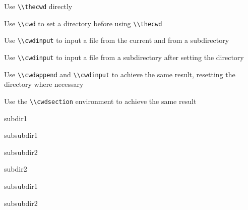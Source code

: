 \documentclass{scrartcl}
\begin{document}
\begin{latexbox}{Use \lstinline{\\thecwd} directly}
    \thecwd
\end{latexbox}

\begin{latexbox}{Use \lstinline{\\cwd} to set a directory before using \lstinline{\\thecwd}}
    \thecwd
\end{latexbox}

\begin{latexbox}{Use \lstinline{\\cwdinput} to input a file from the current and from a subdirectory}
\end{latexbox}

\begin{latexbox}{Use \lstinline{\\cwdinput} to input a file from a subdirectory after setting the directory}
\end{latexbox}

\begin{latexbox}{Use \lstinline{\\cwdappend} and \lstinline{\\cwdinput} to achieve the same result, resetting the directory where necessary}
\end{latexbox}

\begin{latexbox}{Use the \lstinline{\\cwdsection} environment to achieve the same result}
    \begin{cwdsection}{subdir1}
        \begin{cwdsection}{subsubdir1}
        \end{cwdsection}
        \begin{cwdsection}{subsubdir2}
        \end{cwdsection}
    \end{cwdsection}
    \begin{cwdsection}{subdir2}
        \begin{cwdsection}{subsubdir1}
        \end{cwdsection}
        \begin{cwdsection}{subsubdir2}
        \end{cwdsection}
    \end{cwdsection}
\end{latexbox}
\end{document}
